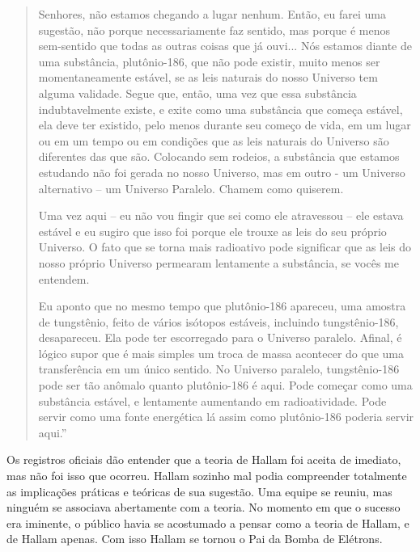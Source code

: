 \documentclass[14pt,portuguese]{extreport}
\begin{document}
        \begin{quotation}
    	    Senhores, não estamos chegando a lugar nenhum. Então, eu farei uma sugestão, não porque necessariamente faz sentido, mas porque é menos sem-sentido que todas as outras coisas que já ouvi... 
    	    Nós estamos diante de uma substância, plutônio-186, que não pode existir, muito menos ser momentaneamente estável, se as leis naturais do nosso Universo tem alguma validade. 
    	    Segue que, então, uma vez que essa substância indubtavelmente existe, e exite como uma substância que começa estável, ela deve ter existido, pelo menos durante seu começo de vida, 
    	    em um lugar ou em um tempo ou em condições que as leis naturais do Universo são diferentes das que são. Colocando sem rodeios, a substância que estamos estudando não foi gerada no nosso Universo, 
    	    mas em outro - um Universo alternativo – um Universo Paralelo. Chamem como quiserem. 
    	    
    	    Uma vez aqui – eu não vou fingir que sei como ele atravessou – ele estava estável e eu sugiro que isso foi porque ele trouxe as leis do seu próprio Universo. O fato que se 
    	    torna mais radioativo pode significar que as leis do nosso próprio Universo permearam lentamente a substância, se vocês me entendem. 
    	    
    	    Eu aponto que no mesmo tempo que plutônio-186 apareceu, uma 
    	    amostra de tungstênio, feito de vários isótopos estáveis, incluindo tungstênio-186, desapareceu. Ela pode ter escorregado para o Universo paralelo. Afinal, é lógico supor que é mais simples 
    	    um troca de massa acontecer do que uma transferência em um único sentido. No Universo paralelo, tungstênio-186 pode ser tão anômalo quanto plutônio-186 é aqui. Pode começar como uma 
    	    substância estável, e lentamente aumentando em radioatividade. Pode servir como uma fonte energética lá assim como plutônio-186 poderia servir aqui.” 

        \end{quotation}  
	    	
    	  Os registros oficiais dão entender que a teoria de Hallam foi aceita de imediato, mas não foi isso que ocorreu. Hallam sozinho mal podia compreender totalmente as implicações práticas e teóricas de sua sugestão. Uma equipe se reuniu, mas ninguém se associava abertamente com a teoria. No momento em que o sucesso era iminente, o público havia se acostumado a pensar como a teoria de Hallam, e de Hallam apenas. Com isso Hallam se tornou o Pai da Bomba de Elétrons.
    	  
\end{document}
